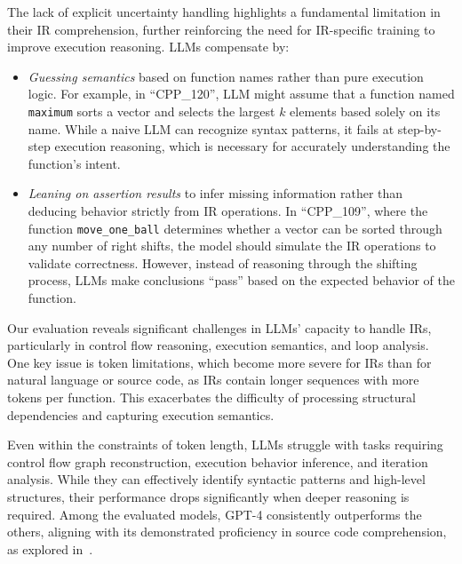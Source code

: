 The lack of explicit uncertainty handling highlights a fundamental limitation in their IR comprehension, further reinforcing the need for IR-specific training to improve execution reasoning.
LLMs compensate by:
\begin{itemize}[nolistsep, leftmargin=*]
    \item \emph{Guessing semantics} based on function names rather than pure execution logic. For example, in ``CPP\_120'', LLM might assume that a function named \texttt{maximum} sorts a vector and selects the largest $k$ elements based solely on its name. While a naive LLM can recognize syntax patterns, it fails at step-by-step execution reasoning, which is necessary for accurately understanding the function's intent. 
    \item \emph{Leaning on assertion results} to infer missing information rather than deducing behavior strictly from IR operations. In ``CPP\_109'', where the function \texttt{move\_one\_ball} determines whether a vector can be sorted through any number of right shifts, the model should simulate the IR operations to validate correctness. However, instead of reasoning through the shifting process, LLMs make conclusions ``pass'' based on the expected behavior of the function.
\end{itemize}

 Our evaluation reveals significant challenges in LLMs' capacity to handle IRs, particularly in control flow reasoning, execution semantics, and loop analysis. One key issue is token limitations, which become more severe for IRs than for natural language or source code, as IRs contain longer sequences with more tokens per function. This exacerbates the difficulty of processing structural dependencies and capturing execution semantics.

Even within the constraints of token length, LLMs struggle with tasks requiring control flow graph reconstruction, execution behavior inference, and iteration analysis. While they can effectively identify syntactic patterns and high-level structures, their performance drops significantly when deeper reasoning is required. Among the evaluated models, GPT-4 consistently outperforms the others, aligning with its demonstrated proficiency in source code comprehension, as explored in~\cite{ma2023lms}.

